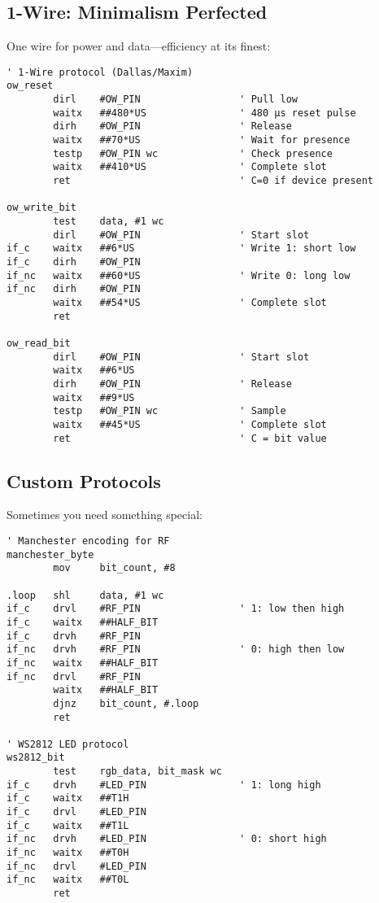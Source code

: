 \documentclass[11pt]{book}
\begin{document}
\hypertarget{wire-minimalism-perfected}{%
\subsection{1-Wire: Minimalism
Perfected}\label{wire-minimalism-perfected}}

One wire for power and data---efficiency at its finest:

\begin{lstlisting}
' 1-Wire protocol (Dallas/Maxim)
ow_reset
        dirl    #OW_PIN                 ' Pull low
        waitx   ##480*US                ' 480 µs reset pulse
        dirh    #OW_PIN                 ' Release
        waitx   ##70*US                 ' Wait for presence
        testp   #OW_PIN wc              ' Check presence
        waitx   ##410*US                ' Complete slot
        ret                             ' C=0 if device present

ow_write_bit
        test    data, #1 wc
        dirl    #OW_PIN                 ' Start slot
if_c    waitx   ##6*US                  ' Write 1: short low
if_c    dirh    #OW_PIN
if_nc   waitx   ##60*US                 ' Write 0: long low
if_nc   dirh    #OW_PIN
        waitx   ##54*US                 ' Complete slot
        ret

ow_read_bit
        dirl    #OW_PIN                 ' Start slot
        waitx   ##6*US
        dirh    #OW_PIN                 ' Release
        waitx   ##9*US
        testp   #OW_PIN wc              ' Sample
        waitx   ##45*US                 ' Complete slot
        ret                             ' C = bit value
\end{lstlisting}

\hypertarget{custom-protocols}{%
\subsection{Custom Protocols}\label{custom-protocols}}

Sometimes you need something special:

\begin{lstlisting}
' Manchester encoding for RF
manchester_byte
        mov     bit_count, #8
        
.loop   shl     data, #1 wc
if_c    drvl    #RF_PIN                 ' 1: low then high
if_c    waitx   ##HALF_BIT
if_c    drvh    #RF_PIN
if_nc   drvh    #RF_PIN                 ' 0: high then low
if_nc   waitx   ##HALF_BIT
if_nc   drvl    #RF_PIN
        waitx   ##HALF_BIT
        djnz    bit_count, #.loop
        ret

' WS2812 LED protocol
ws2812_bit
        test    rgb_data, bit_mask wc
if_c    drvh    #LED_PIN                ' 1: long high
if_c    waitx   ##T1H
if_c    drvl    #LED_PIN
if_c    waitx   ##T1L
if_nc   drvh    #LED_PIN                ' 0: short high
if_nc   waitx   ##T0H
if_nc   drvl    #LED_PIN
if_nc   waitx   ##T0L
        ret
\end{lstlisting}
\end{document}

